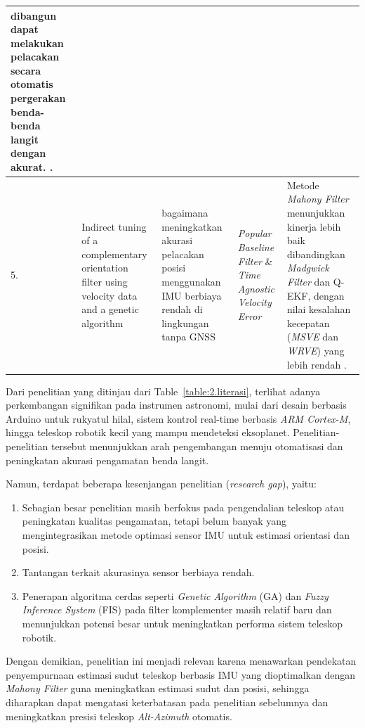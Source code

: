 \begin{longtable}{| b{}|p{}|p{}|p{}|p{}|}
	dibangun dapat melakukan pelacakan secara otomatis pergerakan benda-benda langit dengan akurat. \cite{Burhanuddin2014}.\\
	\hline
	5. & Indirect tuning of a complementary orientation filter using velocity data and a genetic algorithm & bagaimana meningkatkan akurasi pelacakan posisi menggunakan IMU berbiaya rendah di lingkungan tanpa GNSS & \textit{Popular Baseline Filter} \& \textit{Time Agnostic Velocity Error} & Metode \textit{Mahony Filter} menunjukkan kinerja lebih baik dibandingkan \textit{Madgwick Filter} dan Q-EKF, dengan nilai kesalahan kecepatan (\textit{MSVE} dan \textit{WRVE}) yang lebih rendah \cite{Maton2024}.\\ 
	\hline
\end{longtable}
Dari  penelitian yang ditinjau dari Table~\ref{table:2.literasi}, terlihat adanya perkembangan signifikan pada instrumen astronomi, mulai dari desain berbasis Arduino untuk rukyatul hilal, sistem kontrol real-time berbasis \textit{ARM Cortex-M}, hingga teleskop robotik kecil yang mampu mendeteksi eksoplanet. Penelitian-penelitian tersebut menunjukkan arah pengembangan menuju otomatisasi dan peningkatan akurasi pengamatan benda langit.

Namun, terdapat beberapa kesenjangan penelitian (\textit{research gap}), yaitu:

\begin{enumerate}[noitemsep]
	\item Sebagian besar penelitian masih berfokus pada pengendalian teleskop atau peningkatan kualitas pengamatan, tetapi belum banyak yang mengintegrasikan metode optimasi sensor IMU untuk estimasi orientasi dan posisi.
	
	\item Tantangan terkait akurasinya sensor berbiaya rendah.
	
	\item Penerapan algoritma cerdas seperti \textit{Genetic Algorithm} (GA) dan \textit{Fuzzy Inference System} (FIS) pada filter komplementer masih relatif baru dan menunjukkan potensi besar untuk meningkatkan performa sistem teleskop robotik.
	
\end{enumerate}

Dengan demikian, penelitian ini menjadi relevan karena menawarkan pendekatan penyempurnaan estimasi sudut teleskop berbasis IMU yang dioptimalkan dengan \textit{Mahony Filter} guna meningkatkan estimasi sudut dan posisi, sehingga diharapkan dapat mengatasi keterbatasan pada penelitian sebelumnya dan meningkatkan presisi teleskop \textit{Alt-Azimuth} otomatis.

